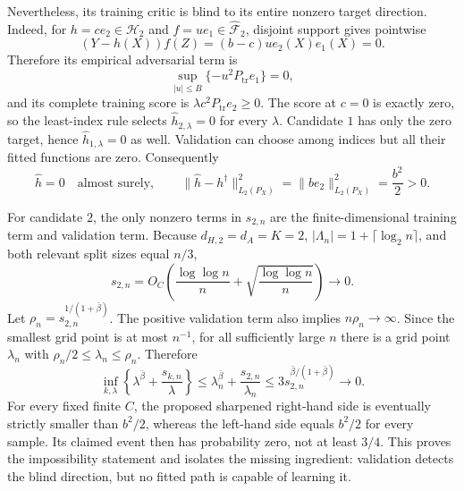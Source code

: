 Nevertheless, its training critic is blind to its entire nonzero target direction. Indeed, for \(h=c e_2\in\mathcal H_2\) and \(f=u e_1\in\widehat{\mathcal F}_2\), disjoint support gives pointwise
\[
 (Y-h(X))f(Z)=(b-c)u e_2(X)e_1(X)=0.
\]
Therefore its empirical adversarial term is
\[
 \sup_{|u|\le B}\{-u^2P_{\mathrm{tr}}e_1\}=0,
\]
and its complete training score is \(\lambda c^2P_{\mathrm{tr}}e_2\ge0\). The score at \(c=0\) is exactly zero, so the least-index rule selects \(\widehat h_{2,\lambda}=0\) for every \(\lambda\). Candidate \(1\) has only the zero target, hence \(\widehat h_{1,\lambda}=0\) as well. Validation can choose among indices but all their fitted functions are zero. Consequently
\[
 \widehat h=0\quad\text{almost surely},
 \qquad
 \|\widehat h-h^\dagger\|_{L_2(P_X)}^2
 =\|b e_2\|_{L_2(P_X)}^2
 =\frac{b^2}{2}>0.
\]

For candidate \(2\), the only nonzero terms in \(s_{2,n}\) are the finite-dimensional training term and validation term. Because \(d_{H,2}=d_A=K=2\), \(|\Lambda_n|=1+\lceil\log_2n\rceil\), and both relevant split sizes equal \(n/3\),
\[
 s_{2,n}
 =O_C\!\left(\frac{\log\log n}{n}
 +\sqrt{\frac{\log\log n}{n}}\right)
 \longrightarrow0.
\]
Let \(\rho_n=s_{2,n}^{1/(1+\bar\beta)}\). The positive validation term also implies \(n\rho_n\to\infty\). Since the smallest grid point is at most \(n^{-1}\), for all sufficiently large \(n\) there is a grid point \(\lambda_n\) with \(\rho_n/2\le\lambda_n\le\rho_n\). Therefore
\[
 \inf_{k,\lambda}
 \left\{\lambda^{\bar\beta}+\frac{s_{k,n}}{\lambda}\right\}
 \le \lambda_n^{\bar\beta}+\frac{s_{2,n}}{\lambda_n}
 \le3s_{2,n}^{\bar\beta/(1+\bar\beta)}
 \longrightarrow0.
\]
For every fixed finite \(C\), the proposed sharpened right-hand side is eventually strictly smaller than \(b^2/2\), whereas the left-hand side equals \(b^2/2\) for every sample. Its claimed event then has probability zero, not at least \(3/4\). This proves the impossibility statement and isolates the missing ingredient: validation detects the blind direction, but no fitted path is capable of learning it.